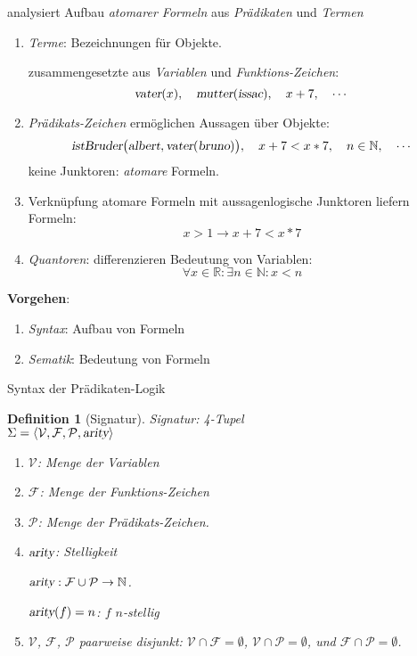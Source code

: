 \documentclass{article}
\newtheorem{Definition}{Definition}
\begin{document}
\noindent
analysiert Aufbau \textsl{atomarer Formeln} aus \textsl{Pr\"{a}dikaten} und \textsl{Termen}

\begin{enumerate}
\item \emph{Terme}:  Bezeichnungen f\"{u}r Objekte.

      zusammengesetzte aus \emph{Variablen} und \emph{Funktions-Zeichen}: 
      \[ \textsl{vater}(x),\quad \textsl{mutter}(\textsl{issac}), \quad x+7, \quad \cdots \]
\item \emph{Pr\"{a}dikats-Zeichen} erm\"{o}glichen Aussagen \"{u}ber Objekte:
      \[ \textsl{istBruder}\bigl(\textsl{albert},
         \textsl{vater}(\textsl{bruno})\bigr),\quad x+7 < x*7,\quad n \in \mathbb{N},
         \quad \cdots \]
      keine Junktoren: \emph{atomare} Formeln.
\item Verkn\"{u}pfung atomare Formeln mit  aussagenlogische Junktoren liefern Formeln:
      \[ x > 1 \rightarrow x + 7 < x * 7 \]
\item \emph{Quantoren}: differenzieren Bedeutung von Variablen:
      \[ \forall x \in \mathbb{R}: \exists n \in \mathbb{N}: x < n \]
\end{enumerate}

\noindent
\textbf{Vorgehen}:
\begin{enumerate}
\item \textsl{Syntax}: Aufbau von Formeln
\item \textsl{Sematik}: Bedeutung von Formeln
\end{enumerate}

\begin{center}
{\Large  Syntax der Pr\"{a}dikaten-Logik}
\end{center}

\begin{Definition}[Signatur]

  Signatur: 4-Tupel \\[0.1cm]
  \hspace*{1.3cm} $\Sigma = \langle \mathcal{V}, \mathcal{F}, \mathcal{P}, \textsl{arity} \rangle$ 
  \begin{enumerate}
  \item $\mathcal{V}$:  Menge der Variablen
  \item $\mathcal{F}$:  Menge der Funktions-Zeichen
  \item $\mathcal{P}$:  Menge der Pr\"{a}dikats-Zeichen.
  \item $\textsl{arity}$: \emph{Stelligkeit} 
         
        $\textsl{arity}: \mathcal{F} \cup \mathcal{P} \rightarrow \mathbb{N}$. 

        $\textsl{arity}(f) = n$: \quad $f$ $n$-stellig
  \item  $\mathcal{V}$, $\mathcal{F}$, $\mathcal{P}$  paarweise disjunkt: \quad
         $\mathcal{V} \cap \mathcal{F} = \emptyset$, \quad $\mathcal{V} \cap \mathcal{P} = \emptyset$, \quad und \quad $\mathcal{F} \cap \mathcal{P} = \emptyset$.
  \end{enumerate}

\end{Definition}
\quad
\end{document}
